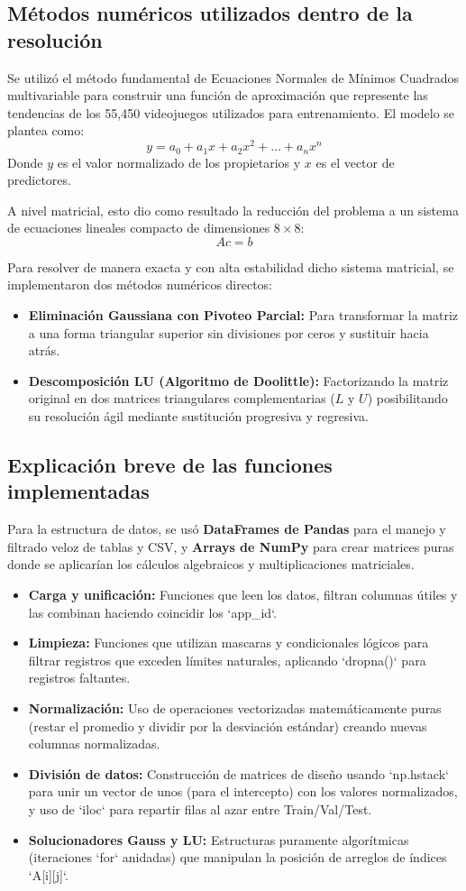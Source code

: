 \documentclass[12pt]{report}
\begin{document}
\subsection*{Métodos numéricos utilizados dentro de la resolución}
Se utilizó el método fundamental de Ecuaciones Normales de Mínimos Cuadrados multivariable para construir una función de aproximación que represente las tendencias de los 55,450 videojuegos utilizados para entrenamiento. El modelo se plantea como:
$$ y = a_0 + a_1x + a_2x^2 + \dots + a_nx^n $$
Donde $y$ es el valor normalizado de los propietarios y $x$ es el vector de predictores.

A nivel matricial, esto dio como resultado la reducción del problema a un sistema de ecuaciones lineales compacto de dimensiones $8 \times 8$:
$$ A c = b $$

Para resolver de manera exacta y con alta estabilidad dicho sistema matricial, se implementaron dos métodos numéricos directos:
\begin{itemize}
    \item \textbf{Eliminación Gaussiana con Pivoteo Parcial:} Para transformar la matriz a una forma triangular superior sin divisiones por ceros y sustituir hacia atrás.
    \item \textbf{Descomposición LU (Algoritmo de Doolittle):} Factorizando la matriz original en dos matrices triangulares complementarias ($L$ y $U$) posibilitando su resolución ágil mediante sustitución progresiva y regresiva.
\end{itemize}

\subsection*{Explicación breve de las funciones implementadas}
Para la estructura de datos, se usó \textbf{DataFrames de Pandas} para el manejo y filtrado veloz de tablas y CSV, y \textbf{Arrays de NumPy} para crear matrices puras donde se aplicarían los cálculos algebraicos y multiplicaciones matriciales.

\begin{itemize}
    \item \textbf{Carga y unificación:} Funciones que leen los datos, filtran columnas útiles y las combinan haciendo coincidir los `app_id`.
    \item \textbf{Limpieza:} Funciones que utilizan mascaras y condicionales lógicos para filtrar registros que exceden límites naturales, aplicando `dropna()` para registros faltantes.
    \item \textbf{Normalización:} Uso de operaciones vectorizadas matemáticamente puras (restar el promedio y dividir por la desviación estándar) creando nuevas columnas normalizadas.
    \item \textbf{División de datos:} Construcción de matrices de diseño usando `np.hstack` para unir un vector de unos (para el intercepto) con los valores normalizados, y uso de `iloc` para repartir filas al azar entre Train/Val/Test.
    \item \textbf{Solucionadores Gauss y LU:} Estructuras puramente algorítmicas (iteraciones `for` anidadas) que manipulan la posición de arreglos de índices `A[i][j]`.
\end{itemize}
\end{document}
